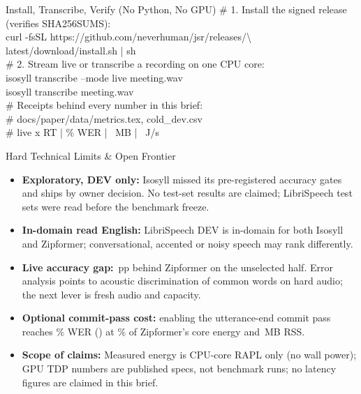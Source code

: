 \documentclass[letterpaper]{article}
\begin{document}
\begin{minipage}[t]{0.486\textwidth}
  \vspace{0pt}
  \begin{codecard}{Install, Transcribe, Verify (No Python, No GPU)}
{\color{codecomment}\# 1. Install the signed release (verifies SHA256SUMS):}\\
curl -fsSL https://github.com/neverhuman/jsr/releases/\textbackslash\\
\hspace*{1.2em}latest/download/install.sh | sh\\[2.5pt]
{\color{codecomment}\# 2. Stream live or transcribe a recording on one CPU core:}\\
isosyll transcribe --mode live meeting.wav\\
isosyll transcribe meeting.wav\\[2.5pt]
{\color{codecomment}\# Receipts behind every number in this brief:}\\
{\color{codecomment}\#   docs/paper/data/metrics.tex, cold\_dev.csv}\\
{\color{codecomment}\#   live  \ColdRcTwoLiveLmSpeed x RT | \ColdRcTwoLiveLmWer\% WER | \ColdRcTwoLiveLmRss\ MB | \ColdRcTwoLiveLmWatts\ J/s}
  \end{codecard}

  \vspace{3pt}
  \begin{govbox}{Hard Technical Limits \& Open Frontier}
    \begin{itemize}[leftmargin=1.1em,itemsep=1.7pt,topsep=1.5pt]
      \item \textbf{Exploratory, DEV only:} Isosyll \releasever{} missed its pre-registered accuracy gates and ships by owner decision. No test-set results are claimed; LibriSpeech test sets were read before the benchmark freeze.
      \item \textbf{In-domain read English:} LibriSpeech DEV is in-domain for both Isosyll and Zipformer; conversational, accented or noisy speech may rank differently.
      \item \textbf{Live accuracy gap:} \CandLiveLmCDelta\,pp behind Zipformer on the unselected half. Error analysis points to acoustic discrimination of common words on hard audio; the next lever is fresh audio and capacity.
      \item \textbf{Optional commit-pass cost:} enabling the utterance-end commit pass reaches \ColdRcTwoFinalWer\% WER (\ColdRcTwoFinalSpeed\x) at \VsEnergyPctTwo\% of Zipformer's core energy and \ColdRcTwoFinalRss\,MB RSS.
      \item \textbf{Scope of claims:} Measured energy is CPU-core RAPL only (no wall power); GPU TDP numbers are published specs, not benchmark runs; no latency figures are claimed in this brief.
    \end{itemize}
  \end{govbox}
\end{minipage}
\end{document}
